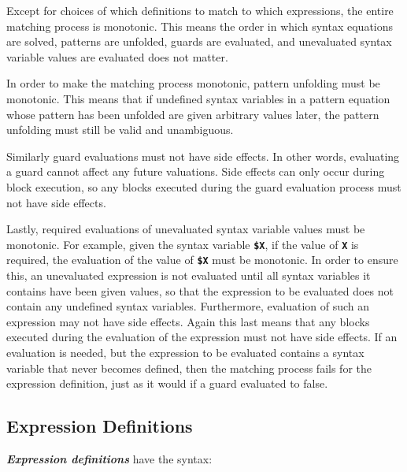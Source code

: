 \documentclass[12pt]{article}
\newcommand{\TT}[1]{{\tt \bfseries #1}}
\newcommand{\ikey}[2]{{\bf \em #1}\index{#2}}
\begin{document}
Except for choices of which definitions to match to which expressions,
the entire matching process is monotonic.  This means the order in which
syntax equations are solved, patterns are unfolded, guards are evaluated,
and unevaluated syntax variable values are evaluated does not matter.

In order to make the matching process monotonic, pattern unfolding must
be monotonic.  This means that if undefined syntax variables in a pattern
equation whose pattern has been unfolded are given arbitrary values later,
the pattern unfolding must still be valid and unambiguous.

Similarly guard evaluations must not have side effects.  In other
words, evaluating a guard cannot affect any future valuations.
Side effects can only occur during block execution, so any blocks
executed during the guard evaluation process must not have side effects.

Lastly, required evaluations of unevaluated syntax variable values
must be monotonic.  For example, given the syntax variable \TT{\$X},
if the value of \TT{X} is required, the evaluation of the value of
\TT{\$X} must be monotonic.
In order to ensure this, an unevaluated expression is not evaluated until
all syntax variables it contains have been given values, so that
the expression to be evaluated does not contain any undefined syntax
variables.  Furthermore, evaluation of such an expression may not have
side effects.  Again this last means that any blocks executed during
the evaluation of the expression must not have side effects.
If an evaluation is needed, but the expression to be evaluated contains
a syntax variable that never becomes defined,
then the matching process fails for the expression definition, just as it
would if a guard evaluated to false.

\subsection{Expression Definitions}
\label{EXPRESSION-DEFINITION}

\ikey{Expression definitions}{expression definition} have the syntax:
\end{document}

